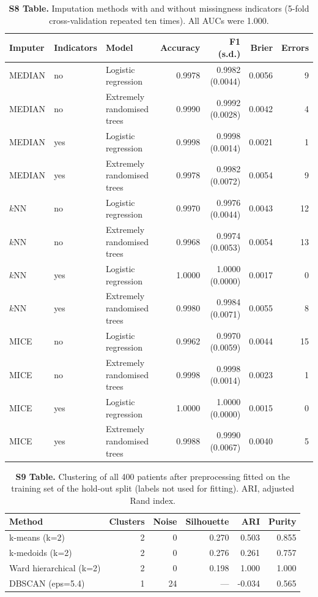 \begin{table}[!ht]\centering\small
\caption{{\bf S8 Table.} Imputation methods with and without missingness indicators (5-fold cross-validation repeated ten times). All AUCs were 1.000.}
\begin{tabular}{lllrrrr}\toprule
Imputer & Indicators & Model & Accuracy & F1 (s.d.) & Brier & Errors\\\midrule
MEDIAN & no & Logistic regression & 0.9978 & 0.9982 (0.0044) & 0.0056 & 9\\
MEDIAN & no & Extremely randomised trees & 0.9990 & 0.9992 (0.0028) & 0.0042 & 4\\
MEDIAN & yes & Logistic regression & 0.9998 & 0.9998 (0.0014) & 0.0021 & 1\\
MEDIAN & yes & Extremely randomised trees & 0.9978 & 0.9982 (0.0072) & 0.0054 & 9\\
$k$NN & no & Logistic regression & 0.9970 & 0.9976 (0.0044) & 0.0043 & 12\\
$k$NN & no & Extremely randomised trees & 0.9968 & 0.9974 (0.0053) & 0.0054 & 13\\
$k$NN & yes & Logistic regression & 1.0000 & 1.0000 (0.0000) & 0.0017 & 0\\
$k$NN & yes & Extremely randomised trees & 0.9980 & 0.9984 (0.0071) & 0.0055 & 8\\
MICE & no & Logistic regression & 0.9962 & 0.9970 (0.0059) & 0.0044 & 15\\
MICE & no & Extremely randomised trees & 0.9998 & 0.9998 (0.0014) & 0.0023 & 1\\
MICE & yes & Logistic regression & 1.0000 & 1.0000 (0.0000) & 0.0015 & 0\\
MICE & yes & Extremely randomised trees & 0.9988 & 0.9990 (0.0067) & 0.0040 & 5\\
\bottomrule\end{tabular}\end{table}

\begin{table}[!ht]\centering\small
\caption{{\bf S9 Table.} Clustering of all 400 patients after preprocessing fitted on the training set of the hold-out split (labels not used for fitting). ARI, adjusted Rand index.}
\begin{tabular}{lrrrrr}\toprule
Method & Clusters & Noise & Silhouette & ARI & Purity\\\midrule
k-means (k=2) & 2 & 0 & 0.270 & 0.503 & 0.855\\
k-medoids (k=2) & 2 & 0 & 0.276 & 0.261 & 0.757\\
Ward hierarchical (k=2) & 2 & 0 & 0.198 & 1.000 & 1.000\\
DBSCAN (eps=5.4) & 1 & 24 & --- & -0.034 & 0.565\\
\bottomrule\end{tabular}\end{table}

